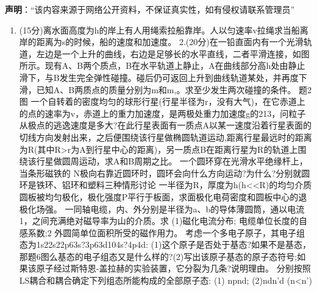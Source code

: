
\textbf{声明}：“该内容来源于网络公开资料，不保证真实性，如有侵权请联系管理员”
\begin{enumerate}
\item (15分)离水面高度为h的岸上有人用绳索拉船靠岸。人以匀速率v拉绳求当船离岸的距离为s的时候，船的速度和加速度。
2.(20分)在一铅直面内有一个光滑轨道，左边是一个上升的曲线，右边是足够长的水平直线，二者平滑连接，如图所示。现有A、B两个质点，B在水平轨道上静止，A在曲线部分高h处由静止滑下，与B发生完全弹性碰撞。碰后仍可返回上升到曲线轨道某处，并再度下滑，已知A、B两质点的质量分别为m和m,。求至少发生两次碰撞的条件。
题2图
一个自转着的密度均匀的球形行星(行星半径为r，没有大气)，在它赤道上的点的速率为v，赤道上的重力加速度，是两极处重力加速度g的213，问粒子从极点的逃逸速度是多大?在此行星表面有一质点A以某一速度沿着行星表面的切线方向发射出来，之后便围绕该行星做椭圆轨道运动,距离行星最远时的距离为R(其中R>r为A到行星中心的距离)，另一质点B在距离行星为R的轨道上围绕该行星做圆周运动，求A和B周期之比。
一个圆环穿在光滑水平绝缘杆上，当条形磁铁的 N极向右靠近圆环时，圆环会向什么方向运动?为什么?分别就圆环是铁环、铝环和塑料三种情形讨论
一半径为R，厚度为h(h<<R)的均匀介质圆板被均匀极化，极化强度P平行于板面，求面极化电荷密度和圆板中心的退极化场强。
一同轴电缆，内、外分别是半径为a、b的导体薄圆筒，通以电流1，之间充满绝对磁导率为山的介质。求
(1)磁化电流分布;
电缆单位长度的自感系数;2
外圆简单位面积所受的磁作用力。
考虑一个多电子原子，其电子组态为1s22s22p63s?3p63d104s?4p4d:
(1)这个原子是否处于基态?如果不是基态，那题6图么基态的电子组态又是什么样的?(2)写出该原子基态的原子态符号;如果该原子经过斯特恩-盖拉赫的实验装置，它分裂为几条?说明理由。
分别按照LS耦合和耦合确定下列组态所能构成的全部原子态:
(1) npnd;
(2)ndn'd (n<n')
\end{enumerate}